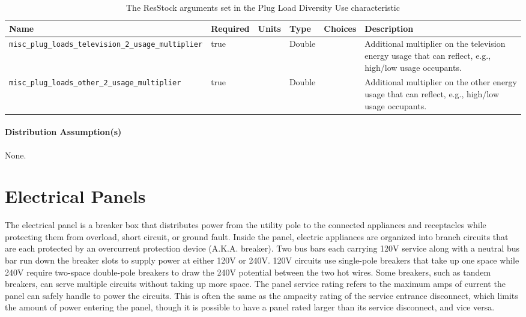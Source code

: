 \begin{longtable}[]{|p{}|p{1.5cm}|p{1.3cm}|p{1.1cm}|p{}|p{}|} \caption{The ResStock arguments set in the Plug Load Diversity Use characteristic} \label{table:hc_arg_def_plug_load_diversity}  \\
\toprule\noalign{}
Name & Required & Units & Type & Choices & Description \\
\midrule\noalign{}
\endhead
\bottomrule\noalign{}
\endlastfoot
\texttt{misc\_plug\_loads\_television\_2\_usage\_multiplier} & true & &
Double & & Additional multiplier on the television energy usage that can
reflect, e.g., high/low usage occupants. \\
\hline
\texttt{misc\_plug\_loads\_other\_2\_usage\_multiplier} & true & &
Double & & Additional multiplier on the other energy usage that can
reflect, e.g., high/low usage occupants. \\
\end{longtable}



\paragraph{Distribution Assumption(s)}
None. 

\section{Electrical Panels} \label{sec:input_panels}
The electrical panel is a breaker box that distributes power from the utility pole to the connected appliances and receptacles while protecting them from overload, short circuit, or ground fault. Inside the panel, electric appliances are organized into branch circuits that are each protected by an overcurrent protection device (A.K.A. breaker). Two bus bars each carrying 120V service along with a neutral bus bar run down the breaker slots to supply power at either 120V or 240V. 120V circuits use single-pole breakers that take up one space while 240V require two-space double-pole breakers to draw the 240V potential between the two hot wires. Some breakers, such as tandem breakers, can serve multiple circuits without taking up more space. The panel service rating refers to the maximum amps of current the panel can safely handle to power the circuits. This is often the same as the ampacity rating of the service entrance disconnect, which limits the amount of power entering the panel, though it is possible to have a panel rated larger than its service disconnect, and vice versa. 

